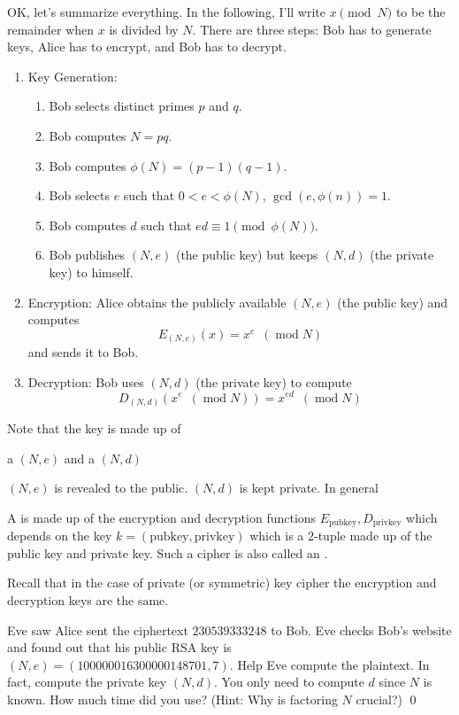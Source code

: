 OK, let's summarize everything.
In the following, I'll write $x \pmod{N}$ to be the remainder when $x$
is divided by $N$.
There are three steps: Bob has to
generate keys, Alice has to encrypt, and Bob has to decrypt.
\begin{enumerate}[nosep]
 \item Key Generation:
  \begin{enumerate}
   \item Bob selects distinct primes $p$ and $q$.
   \item Bob computes $N = pq$.
   \item Bob computes $\phi(N) = (p-1)(q-1)$.
   \item Bob selects $e$ such that $0 < e < \phi(N)$,
   $\gcd(e, \phi(n)) = 1$.
   \item Bob computes $d$ such that
     $ed \equiv 1 \pmod{\phi(N)}$.
 \item Bob publishes $(N,e)$ (the public key) but keeps $(N,d)$
   (the private key) to himself.
  \end{enumerate}
 \item Encryption:
   Alice obtains the publicly available $(N,e)$ (the public key) and
   computes
  \[
   E_{(N,e)}(x) = x^e \,\,\,(\operatorname{mod} N)
  \]
  and sends it to Bob.
 \item Decryption: Bob uses $(N,d)$ (the private key) to compute
 \[
  D_{(N,d)}( x^e \,\,\,(\operatorname{mod} N) ) = x^{ed} \,\,\,(\operatorname{mod} N)
 \]
\end{enumerate}

Note that the key is made up of
\begin{enumerate}[nosep]
  \li a  $(N,e)$ and
  \li a  $(N,d)$
\end{enumerate}
$(N,e)$ is revealed to the public.
$(N,d)$ is kept private.
In general

\begin{defn}
  A  is made up of the encryption
  and decryption functions
  $E_{\text{pubkey}}, D_{\text{privkey}}$ which depends on
  the key
  $k = (\text{pubkey}, \text{privkey})$
  which is a 2-tuple made up of
  the public key and private key.
  Such a cipher is also called an
  .
\end{defn}

Recall that in the case of private (or symmetric) key cipher
the encryption and decryption keys are the same. 

\begin{ex}
  Eve saw Alice sent the ciphertext $230539333248$ to Bob.
  Eve checks Bob's website and found out that his public RSA key is
  $(N, e) = (100000016300000148701, 7)$.
  Help Eve compute the plaintext.
  In fact, compute the private key $(N, d)$.
  You only need to compute $d$ since $N$ is known.
  How much time did you use?
  (Hint: Why is factoring $N$ crucial?)
  \qed
\end{ex}
